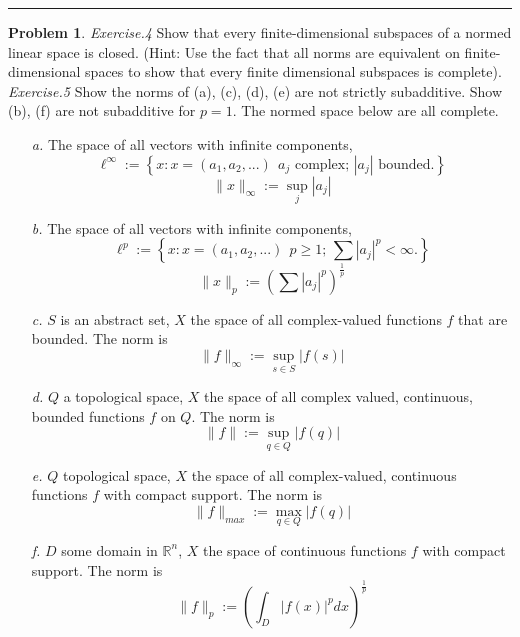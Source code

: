 \documentclass[a4paper, 10pt]{article}
\theoremstyle{definition}
\newtheorem{problem}{Problem}
\theoremstyle{hSol}
\begin{document}
\noindent\rule{16cm}{0.4pt}
\begin{problem} \textit{Exercise.4} Show that every finite-dimensional subspaces of a normed linear space is closed. (Hint: Use the fact that all norms are equivalent on finite-dimensional spaces to show that every finite dimensional subspaces is complete). \\
\textit{Exercise.5} Show the norms of (a), (c), (d), (e) are not strictly subadditive. Show (b), (f) are not subadditive for $p=1$. The normed space below are all complete.
\begin{itemize}
	\item[\textit{a.}] The space of all vectors with infinite components, 
	$$\ell^{\infty}:=\left\{x: x=(a_1, a_2, ...)~~\text{$a_j$ complex; $|a_j|$ bounded.}\right\}$$
	$$\|x\|_{\infty}:=\sup\limits_{j}|a_j|$$

	\item[\textit{b.}] The space of all vectors with infinite components, 
	$$\ell^{p}:=\left\{x: x=(a_1, a_2, ...)~~\text{$p\geq 1$; $\sum|a_j|^p<\infty$.}\right\}$$
	$$\|x\|_{p}:=\left(\sum|a_j|^p\right)^{\frac{1}{p}}$$

	\item[\textit{c.}] $S$ is an abstract set, $X$ the space of all complex-valued functions $f$ that are bounded. The norm is
	$$\|f\|_{\infty}:=\sup\limits_{s\in S}|f(s)|$$

	\item[\textit{d.}] $Q$ a topological space, $X$ the space of all complex valued, continuous, bounded functions $f$ on $Q$. The norm is
	$$\|f\|:=\sup\limits_{q\in Q}|f(q)|$$

	\item[\textit{e.}] $Q$ topological space, $X$ the space of all complex-valued, continuous functions $f$ with compact support. The norm is
	$$\|f\|_{max} := \max\limits_{q\in Q}|f(q)|$$

	\item[\textit{f.}] $D$ some domain in $\mathbb{R}^n$, $X$ the space of continuous functions $f$ with compact support. The norm is
	$$\|f\|_p := \left(\int_D |f(x)|^p dx\right)^{\frac{1}{p}}$$
\end{itemize}
\end{problem}
\end{document}
